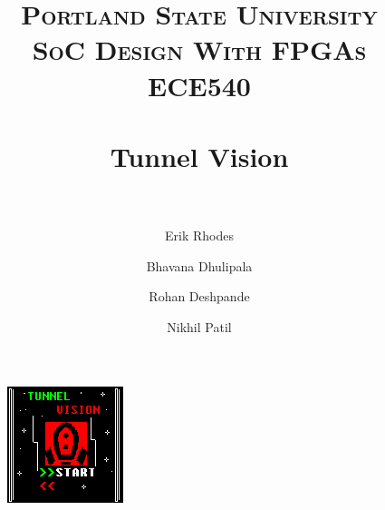\documentclass[11pt]{article}
\title{	
\normalfont \normalsize 
\textsc{\LARGE Portland State University}\\[1.5cm] %
\textsc{\Large SoC Design With FPGAs}\\[0.5cm] %
\textsc{\large ECE540}\\[0.5cm] %
\horrule{1.2pt} \\[0.4cm] %
\huge Tunnel Vision \\ %
\horrule{1.2pt} \\[0.5cm] %
}
\begin{document}
\raggedright
\author{Erik Rhodes \and Bhavana Dhulipala \and Rohan Deshpande \and Nikhil Patil} %
\maketitle %
\thispagestyle{empty}


\begin{figure}[h]\centering
\includegraphics[height=0.65\textwidth]{Images/start.png}
		\label{start}
	\end{figure}

\tableofcontents

%

%	
\end{document}
